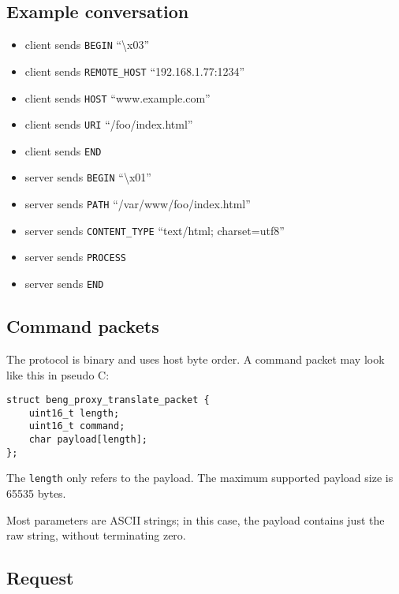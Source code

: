 \documentclass[a4paper,12pt]{article}
\begin{document}
\subsection{Example conversation}

\begin{itemize}
\item client sends \verb|BEGIN| ``\textbackslash{}x03''
\item client sends \verb|REMOTE_HOST| ``192.168.1.77:1234''
\item client sends \verb|HOST| ``www.example.com''
\item client sends \verb|URI| ``/foo/index.html''
\item client sends \verb|END|
\item server sends \verb|BEGIN| ``\textbackslash{}x01''
\item server sends \verb|PATH| ``/var/www/foo/index.html''
\item server sends \verb|CONTENT_TYPE| ``text/html; charset=utf8''
\item server sends \verb|PROCESS|
\item server sends \verb|END|
\end{itemize}

\subsection{Command packets}

The protocol is binary and uses host byte order.  A command packet may
look like this in pseudo C:

\begin{verbatim}
struct beng_proxy_translate_packet {
    uint16_t length;
    uint16_t command;
    char payload[length];
};
\end{verbatim}

The \texttt{length} only refers to the payload.  The maximum supported
payload size is 65535 bytes.

Most parameters are ASCII strings; in this case, the payload contains
just the raw string, without terminating zero.

\subsection{Request}
\end{document}
